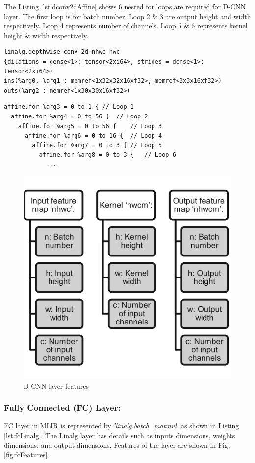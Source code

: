 The Listing \ref{lst:dconv2dAffine} shows 6 nested for loops are required for D-CNN layer. The first loop is for batch number. Loop 2 \& 3 are output height and width respectively.  Loop 4 represents number of channels. Loop 5 \& 6 represents kernel height \& width respectively.
\\
\begin{lstlisting}[caption={Example depth-wise conv2d at Linalg dialect}, label={lst:dconv2dLinalg}]
linalg.depthwise_conv_2d_nhwc_hwc 
{dilations = dense<1>: tensor<2xi64>, strides = dense<1>: tensor<2xi64>} 
ins(%arg0, %arg1 : memref<1x32x32x16xf32>, memref<3x3x16xf32>) 
outs(%arg2 : memref<1x30x30x16xf32>)
\end{lstlisting}
\clearpage
\begin{lstlisting}[caption={Example depth-wise conv2d at Affine dialect}, label={lst:dconv2dAffine}]
affine.for %arg3 = 0 to 1 { // Loop 1
  affine.for %arg4 = 0 to 56 {  // Loop 2
    affine.for %arg5 = 0 to 56 {    // Loop 3
      affine.for %arg6 = 0 to 16 {  // Loop 4
        affine.for %arg7 = 0 to 3 { // Loop 5
          affine.for %arg8 = 0 to 3 {   // Loop 6
            ...
\end{lstlisting}

\begin{figure}[H]
    \centering
    \includegraphics[width=0.5\linewidth]{figure//chapter3_implementation/Figure 3 - dconv2d features.png}
    \caption{D-CNN layer features}
    \label{fig:dcnnFeatures}
\end{figure}


\subsubsection{Fully Connected (FC) Layer:}

FC layer in MLIR is represented by \textit{'linalg.batch\_matmul'} as shown in Listing \ref{lst:fcLinalg}. The Linalg layer has details such as inputs dimensions, weights dimensions, and output dimensions. Features of the layer are shown in Fig. \ref{fig:fcFeatures}

